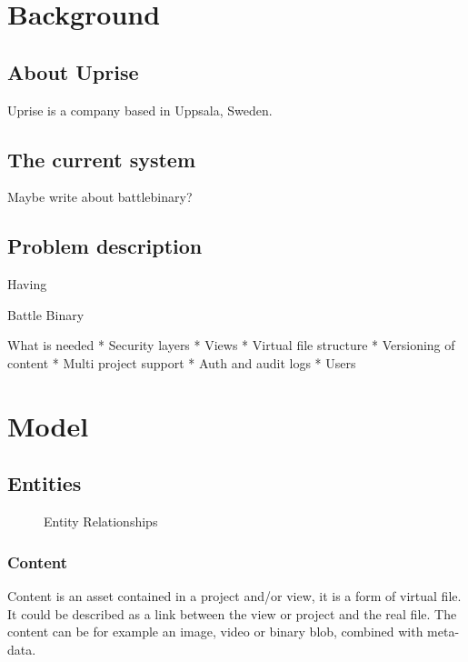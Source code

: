 \documentclass[a4paper,12pt]{article}
\begin{document}
\section{Background}
\subsection{About Uprise}
Uprise is a company based in Uppsala, Sweden. 

\subsection{The current system}
Maybe write about battlebinary?  

\subsection{Problem description}
Having
  
Battle Binary

What is needed
* Security layers
* Views
* Virtual file structure
* Versioning of content
* Multi project support
* Auth and audit logs
* Users
\newpage 
\section{Model}
\newpage 
\subsection{Entities}
\begin{figure}[htp] 
    \caption{Entity Relationships}
    \label{fig:relation}
\end{figure}

\subsubsection{Content}
Content is an asset contained in a project and/or view, it is a form of virtual file.
It could be described as a link between the view or project and the real file. 
    The content can be for example an image, video or binary blob, combined with meta-data.
\end{document}
